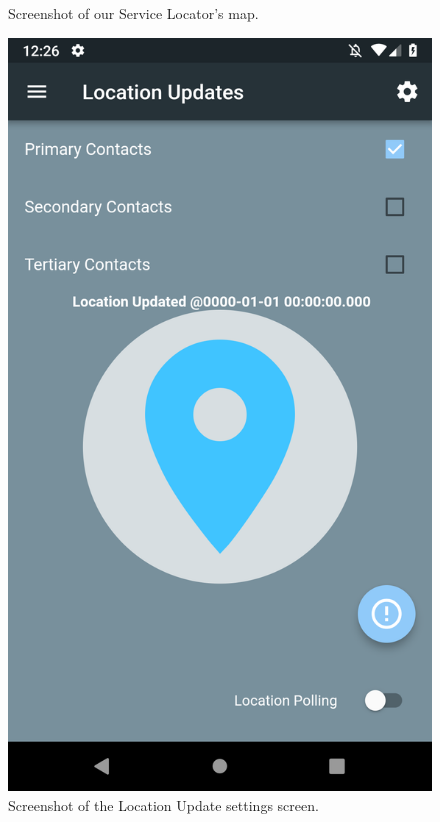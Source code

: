 \documentclass[10pt, a4paper]{article}
\begin{document}
\begin{figure}[H]
  \caption{Screenshot of our Service Locator's map.}
\endminipage\hfill
{}
  \includegraphics[width=\linewidth]{final-diagrams/Emulator-Screenshots/Screenshot_1556126766.png}
  \caption{Screenshot of the Location Update settings screen.}
\endminipage\hfill
{}%

\end{figure}
\end{document}
